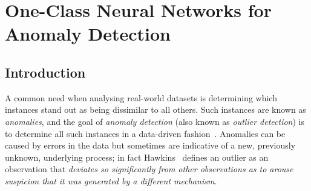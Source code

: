 \chapter{One-Class Neural Networks for Anomaly Detection}
\label{chpt:ocnn}
\section{Introduction}

A common need when analysing real-world datasets is determining which instances stand out as being dissimilar to all others. Such instances are known as \emph{anomalies}, and the goal of \emph{anomaly detection} (also known as \emph{outlier detection}) is to determine all such instances in a data-driven fashion~\cite{chandola2007outlier}. Anomalies can be caused by errors in the data but sometimes are indicative of a new, previously unknown, underlying process; in fact Hawkins~\cite{hawkins1980identification} defines an outlier as an observation that {\it deviates so significantly from other observations as to arouse suspicion that it was generated by a different mechanism.}

